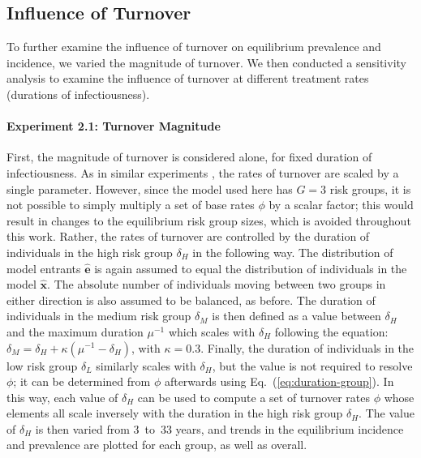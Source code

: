 \subsection{Influence of Turnover}\label{ss:exp-turnover}  %
To further examine the influence of turnover on equilibrium prevalence and incidence, 
we varied the magnitude of turnover. We then conducted a sensitivity analysis   %
to examine the influence of turnover at different treatment rates (durations of infectiousness).
\paragraph{Experiment 2.1: Turnover Magnitude}
First, the magnitude of turnover is considered alone,
for fixed duration of infectiousness.
As in similar experiments \citep{Zhang2012,Henry2015},
the rates of turnover are scaled by a single parameter.
However, since the model used here has $G = 3$ risk groups,
it is not possible to simply multiply a set of base rates $\phi$ by a scalar factor;
this would result in changes to the equilibrium risk group sizes,
which is avoided throughout this work.
Rather, the rates of turnover are controlled by
the duration of individuals in the high risk group $\delta_H$ in the following way.
The distribution of model entrants $\bm{\hat{e}}$ is again assumed to equal
the distribution of individuals in the model $\bm{\hat{x}}$.
The absolute number of individuals moving between two groups in either direction
is also assumed to be balanced, as before.
The duration of individuals in the medium risk group $\delta_M$
is then defined as a value between $\delta_H$ and the maximum duration $\mu^{-1}$
which scales with $\delta_H$ following the equation:
$\delta_M = \delta_H + \kappa \left(\mu^{-1} - \delta_H\right)$, with $\kappa = 0.3$.
Finally, the duration of individuals in the low risk group $\delta_L$
similarly scales with $\delta_H$,
but the value is not required to resolve $\phi$;
it can be determined from $\phi$ afterwards
using Eq.~(\ref{eq:duration-group}).
In this way, each value of $\delta_H$ can be used to compute a set of turnover rates $\phi$
whose elements all scale inversely with the duration in the high risk group $\delta_H$.
The value of $\delta_H$ is then varied from 3~to~33 years,
and trends in the equilibrium incidence and prevalence are plotted
for each group, as well as overall.
\par

